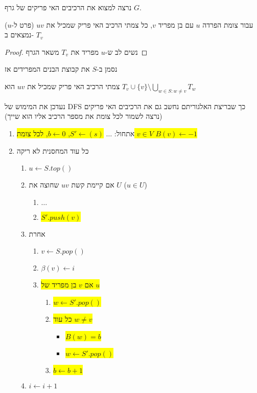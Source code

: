 נרצה למצוא את הרכיבים האי פריקים של גרף $G$.
\begin{claim}
עבור צומת הפרדה $u$ עם בן מפריד $v$, כל צמתי הרכיב האי פריק שמכיל את $uv$ (פרט ל-$u$)
נמצאים ב-%
$T_v$
\end{claim}
\begin{proof}
נשים לב ש-$u$ מפריד את 
$T_v$
משאר הגרף
\end{proof}
נסמן ב-$S$ את קבוצת הבנים המפרידים אז
\begin{corollary}
צמתי הרכיב האי פריק שמכיל את $uv$ הוא 
$T_v \cup \{v\} \setminus \bigcup_{w \in S:w \ne v} T_w$
\end{corollary}


נעדכן את המימוש של DFS כך שבריצת האלגוריתם נחשב גם את הרכיבים האי פריקים 
(נרצה לשמור לכל צומת את מספר הרכיב אליו הוא שייך)
\begin{enumerate}
\item
אתחול:
$\ldots$
\colorbox{yellow}{
$S' \leftarrow (s)$,
$b \leftarrow 0$,
לכל צומת 
$v \in V$
$B(v) \leftarrow -1$
}
\item
כל עוד המחסנית לא ריקה
\begin{enumerate}
	\item
	$u \leftarrow S.top()$
	\item 
	אם קיימת קשת 
	$uv$
	שחוצה את $U$ 
	($u \in U$)
		\begin{enumerate}
		\item $\ldots$
		\item
		\colorbox{yellow}{$S'.push(v)$}
		\end{enumerate}
	\item
	אחרת 
	\begin{enumerate}
		\item $v \leftarrow S.pop()$
		\item $\beta(v) \leftarrow i$

		\item 
				\colorbox{yellow}{
אם $v$ בן מפריד של $u$
		}
			\begin{enumerate}
				\item \colorbox{yellow}{$w \leftarrow S'.pop()$}
				\item \colorbox{yellow}{
כל עוד 
				$w \ne v$
				}
					\begin{itemize}
						\item \colorbox{yellow}{$B(w) = b$}
						\item \colorbox{yellow}{$w \leftarrow S'.pop()$}
					\end{itemize}	
			\item \colorbox{yellow}{$b \leftarrow b + 1$}
			\end{enumerate}			
	\end{enumerate}
	\item
	$i \leftarrow i + 1$
	\end{enumerate}
\end{enumerate}

